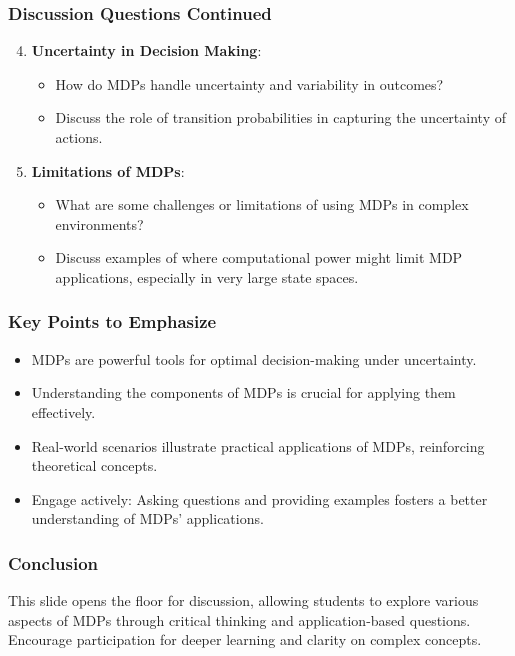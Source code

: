 \documentclass[aspectratio=169]{beamer}
\begin{document}
\begin{frame}[fragile]
    \frametitle{Discussion Questions Continued}
    \begin{enumerate}
        \setcounter{enumi}{3} %
        \item \textbf{Uncertainty in Decision Making}:
        \begin{itemize}
            \item How do MDPs handle uncertainty and variability in outcomes?
            \item Discuss the role of transition probabilities in capturing the uncertainty of actions.
        \end{itemize}

        \item \textbf{Limitations of MDPs}: 
        \begin{itemize}
            \item What are some challenges or limitations of using MDPs in complex environments?
            \item Discuss examples of where computational power might limit MDP applications, especially in very large state spaces.
        \end{itemize}
    \end{enumerate}
\end{frame}

\begin{frame}[fragile]
    \frametitle{Key Points to Emphasize}
    \begin{itemize}
        \item MDPs are powerful tools for optimal decision-making under uncertainty.
        \item Understanding the components of MDPs is crucial for applying them effectively.
        \item Real-world scenarios illustrate practical applications of MDPs, reinforcing theoretical concepts.
        \item Engage actively: Asking questions and providing examples fosters a better understanding of MDPs’ applications.
    \end{itemize}
\end{frame}

\begin{frame}[fragile]
    \frametitle{Conclusion}
    This slide opens the floor for discussion, allowing students to explore various aspects of MDPs through critical thinking and application-based questions. Encourage participation for deeper learning and clarity on complex concepts.
\end{frame}
\end{document}

